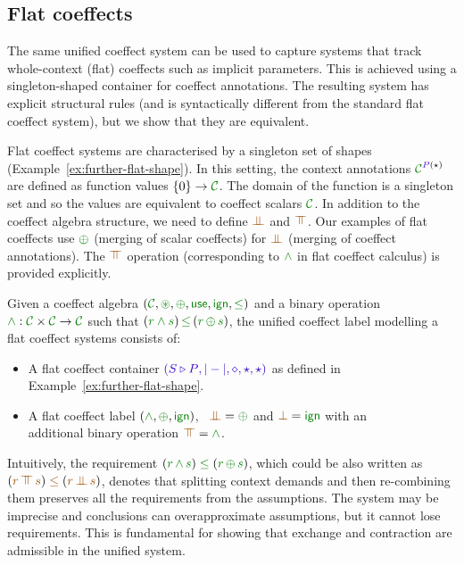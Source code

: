 
\subsection{Flat coeffects}
\label{sec:further-flat}

The same unified coeffect system can be used to capture systems that track whole-context (flat)
coeffects such as implicit parameters. This is achieved using a singleton-shaped container for
coeffect annotations. The resulting system has explicit structural rules (and is syntactically
different from the standard flat coeffect system), but we show that they are equivalent.

Flat coeffect systems are characterised by a singleton set of shapes (Example~\ref{ex:further-flat-shape}).
In this setting, the context annotations $\C^{ \SP(\sflat) }$ are defined as function values
$\{0\} \rightarrow \C$. The domain of the function is a singleton set and so the values are equivalent
to coeffect scalars $\C$. In addition to the coeffect algebra structure, we need to define $\apar$
and $\azip$. Our examples of flat coeffects use $\cpar$ (merging of scalar coeffects) for $\apar$
(merging of coeffect annotations). The $\azip$ operation (corresponding to $\czip$
in flat coeffect calculus) is provided explicitly.

\begin{definition}
\label{def:further-flat}
Given a coeffect algebra $(\C, \cseq, \cpar, \cunit, \czero, \cleq)$ and a binary operation
$\cclrd{\wedge} : \C \times \C \rightarrow \C$ such that $(\cclrd{r \wedge s}) \,\cleq\, (\cclrd{r}\,\cpar\,\cclrd{s})$,
the unified coeffect label modelling a flat coeffect systems consists of:
%
\begin{itemize}{}
\item A flat coeffect container $\sclrd{(\SHP, {|}-{|}, \diamond, \sflat, \sflat)}$ as defined in
  Example~\ref{ex:further-flat-shape}.

\item A flat coeffect label $(\czip, \cpar, \czero)$, \ie~$\apar = \cpar$
  and $\azero = \czero$ with an\\ additional binary operation $\azip = \czip$.
\end{itemize}
\end{definition}

\noindent
Intuitively, the requirement $(\cclrd{r}\,\czip\,\cclrd{s}) \;\cleq\; (\cclrd{r}\,\cpar\,\cclrd{s})$,
which could be also written as $(\aclrd{r}\,\azip\,\aclrd{s}) \;\aclrd{\leq}\; (\aclrd{r}\,\apar\,\aclrd{s})$,
denotes that splitting context demands and then re-combining them preserves all the requirements
from the assumptions. The system may be imprecise and conclusions can overapproximate assumptions, but
it cannot lose requirements. This is fundamental for showing that exchange and contraction are admissible
in the unified system.

